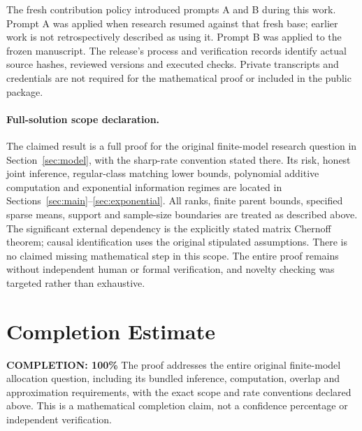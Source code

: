 \documentclass[11pt,a4paper]{article}
\numberwithin{equation}{section}
\theoremstyle{definition}
\begin{document}
The fresh contribution policy introduced prompts A and B during this
work. Prompt A was applied when research resumed against that fresh
base; earlier work is not retrospectively described as using it.
Prompt B was applied to the frozen manuscript. The release's process
and verification records identify actual source hashes, reviewed
versions and executed checks. Private transcripts and credentials are
not required for the mathematical proof or included in the public package.

\paragraph{Full-solution scope declaration.}
The claimed result is a full proof for the original finite-model research
question in Section~\ref{sec:model}, with the sharp-rate convention stated
there. Its risk, honest joint inference, regular-class matching lower
bounds, polynomial additive computation and exponential information
regimes are located in Sections~\ref{sec:main}--\ref{sec:exponential}.
All ranks, finite parent bounds, specified sparse means, support and
sample-size boundaries are treated as described above. The significant
external dependency is the explicitly stated matrix Chernoff theorem;
causal identification uses the original stipulated assumptions.
There is no claimed missing mathematical step in this scope. The entire
proof remains without independent human or formal verification, and
novelty checking was targeted rather than exhaustive.

\section{Completion Estimate}
\noindent\textbf{COMPLETION: 100\%}
The proof addresses the entire original finite-model allocation question,
including its bundled inference, computation, overlap and approximation
requirements, with the exact scope and rate conventions declared above.
This is a mathematical completion claim, not a confidence percentage or
independent verification.
\end{document}
